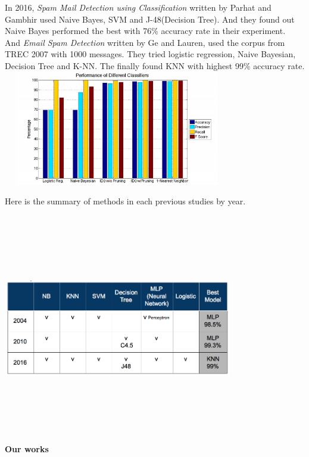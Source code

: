 \documentclass[10pt, letterpaper, titlepage]{article}
\begin{document}
In 2016, \textit{Spam Mail Detection using Classification} written by Parhat and Gambhir used Naive Bayes, SVM and J-48(Decision Tree). And they found out Naive Bayes performed the best with 76\% accuracy rate in their experiment. \\ And \textit{Email Spam Detection} written by Ge and  Lauren, used the corpus from TREC 2007 with 1000 messages. They tried logistic regression, Naive Bayesian, Decision Tree and K-NN. The finally found KNN with highest 99\% accuracy rate. \\
\includegraphics[width=10cm,height=5cm,keepaspectratio]{2016.png}

Here is the summary of methods in each previous studies by year. 

\includegraphics[width=10cm,height=10cm,keepaspectratio]{Method_Summary.png}\\


\textbf{Our works}\\
\end{document}
